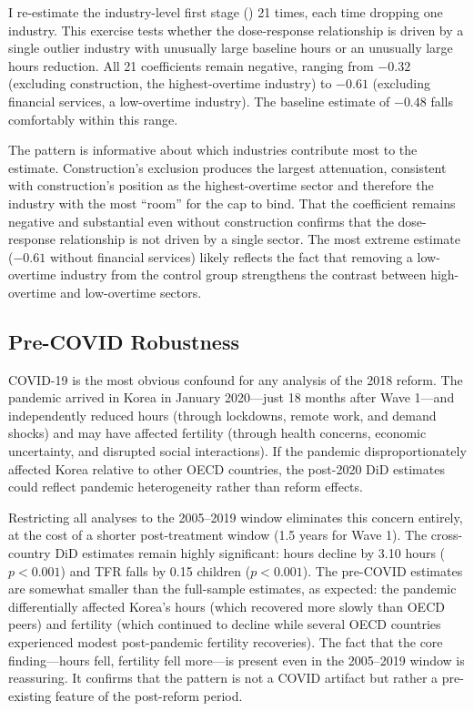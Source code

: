 \documentclass[12pt]{article}
\begin{document}
I re-estimate the industry-level first stage () 21 times, each time dropping one industry. This exercise tests whether the dose-response relationship is driven by a single outlier industry with unusually large baseline hours or an unusually large hours reduction. All 21 coefficients remain negative, ranging from $-0.32$ (excluding construction, the highest-overtime industry) to $-0.61$ (excluding financial services, a low-overtime industry). The baseline estimate of $-0.48$ falls comfortably within this range.

The pattern is informative about which industries contribute most to the estimate. Construction's exclusion produces the largest attenuation, consistent with construction's position as the highest-overtime sector and therefore the industry with the most ``room'' for the cap to bind. That the coefficient remains negative and substantial even without construction confirms that the dose-response relationship is not driven by a single sector. The most extreme estimate ($-0.61$ without financial services) likely reflects the fact that removing a low-overtime industry from the control group strengthens the contrast between high-overtime and low-overtime sectors.

\subsection{Pre-COVID Robustness}

COVID-19 is the most obvious confound for any analysis of the 2018 reform. The pandemic arrived in Korea in January 2020---just 18 months after Wave 1---and independently reduced hours (through lockdowns, remote work, and demand shocks) and may have affected fertility (through health concerns, economic uncertainty, and disrupted social interactions). If the pandemic disproportionately affected Korea relative to other OECD countries, the post-2020 DiD estimates could reflect pandemic heterogeneity rather than reform effects.

Restricting all analyses to the 2005--2019 window eliminates this concern entirely, at the cost of a shorter post-treatment window (1.5 years for Wave 1). The cross-country DiD estimates remain highly significant: hours decline by 3.10 hours ($p < 0.001$) and TFR falls by 0.15 children ($p < 0.001$). The pre-COVID estimates are somewhat smaller than the full-sample estimates, as expected: the pandemic differentially affected Korea's hours (which recovered more slowly than OECD peers) and fertility (which continued to decline while several OECD countries experienced modest post-pandemic fertility recoveries). The fact that the core finding---hours fell, fertility fell more---is present even in the 2005--2019 window is reassuring. It confirms that the pattern is not a COVID artifact but rather a pre-existing feature of the post-reform period.
\end{document}
